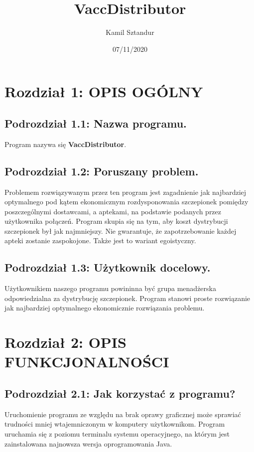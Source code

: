 \documentclass[a4paper]{article}
\title{\textbf{VaccDistributor}}
\author{Kamil Sztandur}
\date{07/11/2020}
\newcommand\tab[1][1cm]{\hspace*{#1}}
\begin{document}
\begin{tcolorbox}
\maketitle
\end{tcolorbox}
\newpage

\section*{Rozdział 1: OPIS OGÓLNY}
\subsection*{Podrozdział 1.1: Nazwa programu.}
\tab Program nazywa się \textbf{VaccDistributor}.
\subsection*{Podrozdział 1.2: Poruszany problem.}
\tab Problemem rozwiązywanym przez ten program jest zagadnienie jak najbardziej optymalnego pod kątem ekonomicznym rozdysponowania szczepionek pomiędzy poszczególnymi dostawcami, a aptekami, na podstawie podanych przez użytkownika połączeń. Program skupia się na tym, aby koszt dystrybucji szczepionek był jak najmniejszy. Nie gwarantuje, że zapotrzebowanie każdej apteki zostanie zaspokojone. Także jest to wariant egoistyczny.
\subsection*{Podrozdział 1.3: Użytkownik docelowy.}
\tab Użytkownikiem naszego programu powininna być grupa menadżerska odpowiedzialna za dystrybucję szczepionek. Program stanowi proste rozwiązanie jak najbardziej optymalnego ekonomicznie rozwiązania problemu. 
\newline

\section*{Rozdział 2: OPIS FUNKCJONALNOŚCI}
\subsection*{Podrozdział 2.1: Jak korzystać z programu?}
\tab Uruchomienie programu ze względu na brak oprawy graficznej może sprawiać trudności mniej wtajemniczonym w komputery użytkownikom. Program uruchamia się z poziomu terminalu systemu operacyjnego, na którym jest zainstalowana najnowsza wersja oprogramowania Java. 
\end{document}
